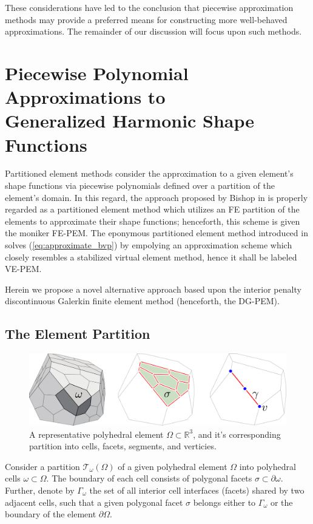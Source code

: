 	These considerations have led to the conclusion that piecewise approximation methods may provide a preferred means for constructing more well-behaved approximations. The remainder of our discussion will focus upon such methods.
	
\section{Piecewise Polynomial Approximations to \\ Generalized Harmonic Shape Functions}

Partitioned element methods consider the approximation to a given element's shape functions via piecewise polynomials defined over a partition of the element's domain. In this regard, the approach proposed by Bishop in \cite{Bishop:14} is properly regarded as a partitioned element method which utilizes an FE partition of the elements to approximate their shape functions; henceforth, this scheme is given the moniker FE-PEM. The eponymous partitioned element method introduced in \cite{Rashid:12} solves (\ref{eq:approximate_bvp}) by empolying an approximation scheme which closely resembles a stabilized virtual element method, hence it shall be labeled VE-PEM.

Herein we propose a novel alternative approach based upon the interior penalty discontinuous Galerkin finite element method (henceforth, the DG-PEM).

\subsection*{The Element Partition}

\begin{figure} [!ht]
	\centering
	\includegraphics[width = 6.0in]{figures/polyhedron_partition.pdf}
	\caption{A representative polyhedral element $\Omega \subset \mathbb{R}^3$, and it's corresponding partition into cells, facets, segments, and verticies.}
	\label{fig:partitioned_element}
\end{figure}

	Consider a partition $\mathcal{T}_\omega (\Omega)$ of a given polyhedral element $\Omega$ into polyhedral cells $\omega \subset \Omega$. The boundary of each cell consists of polygonal facets $\sigma \subset \partial \omega$. Further, denote by $\Gamma_\omega$ the set of all interior cell interfaces (facets) shared by two adjacent cells, such that a given polygonal facet $\sigma$ belongs either to $\Gamma_\omega$ or the boundary of the element $\partial \Omega$.
	
